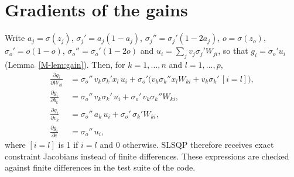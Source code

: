 \documentclass[11pt,a4paper]{article}
\newcommand{\sig}{\sigma}
\begin{document}
\section{Gradients of the gains}\label{sup:gradients}
Write $a_j=\sig(z_j)$, $\sig_j'=a_j(1-a_j)$, $\sig_j''=\sig_j'(1-2a_j)$, $o=\sig(z_o)$, $\sig_o'=o(1-o)$,
$\sig_o''=\sig_o'(1-2o)$ and $u_i=\sum_jv_j\sig_j'W_{ji}$, so that $g_i=\sig_o'u_i$ (Lemma~\ref{M-lem:gain}). Then, for
$k=1,\dots,n$ and $l=1,\dots,p$,
\begin{align*}
\frac{\partial g_i}{\partial W_{kl}}&=\sig_o''\,v_k\sig_k'x_l\,u_i+\sig_o'\bigl(v_k\sig_k''x_lW_{ki}+v_k\sig_k'\,[i=l]\bigr),\\
\frac{\partial g_i}{\partial b_k}&=\sig_o''\,v_k\sig_k'\,u_i+\sig_o'\,v_k\sig_k''W_{ki},\\
\frac{\partial g_i}{\partial v_k}&=\sig_o''\,a_k\,u_i+\sig_o'\,\sig_k'W_{ki},\\
\frac{\partial g_i}{\partial c}&=\sig_o''\,u_i ,
\end{align*}
where $[i=l]$ is 1 if $i=l$ and 0 otherwise. SLSQP therefore receives exact constraint Jacobians instead of finite
differences. These expressions are checked against finite differences in the test suite of the code.

\end{document}
